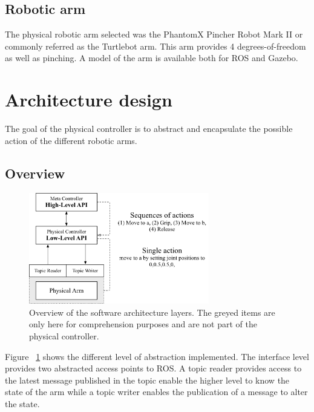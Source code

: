 \subsection{Robotic arm}

The physical robotic arm selected was the PhantomX Pincher Robot Mark II \cite{noauthor_phantomx_nodate} or commonly referred as the Turtlebot arm. This arm provides 4 degrees-of-freedom as well as pinching. A model of the arm is available both for ROS and Gazebo. 

\section{Architecture design}

The goal of the physical controller is to abstract and encapsulate the possible action of the different robotic arms.

\subsection{Overview}

\begin{figure}
\centering
\includegraphics[width=0.7\textwidth]{imgs/ros-gazebo-archi.png}
\caption[Overview of the ROS wrapper architecture]{Overview of the software architecture layers. The greyed items are only here for comprehension purposes and are not part of the physical controller.}
\label{fig:ros-wrapper-architecture}
\end{figure}

Figure ~\ref{fig:ros-wrapper-architecture} shows the different level of abstraction implemented. The interface level provides two abstracted access points to ROS. A topic reader provides access to the latest message published in the topic enable the higher level to know the state of the arm while a topic writer enables the publication of a message to alter the state.

